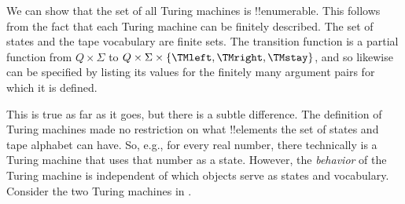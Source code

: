 \documentclass[../../../include/open-logic-section]{subfiles}
\begin{document}

\begin{explain}
We can show that the set of all Turing machines is !!{enumerable}.
This follows from the fact that each Turing machine can be finitely
described.  The set of states and the tape vocabulary are finite sets.
The transition function is a partial function from $Q \times \Sigma$
to $Q \times \Sigma \times \{\TMleft, \TMright, \TMstay\}$, and so
likewise can be specified by listing its values for the finitely many
argument pairs for which it is defined.

This is true as far as it goes, but there is a subtle difference. The
definition of Turing machines made no restriction on what !!{element}s
the set of states and tape alphabet can have. So, e.g., for every real
number, there technically is a Turing machine that uses that number as
a state. However, the \emph{behavior} of the Turing machine is
independent of which objects serve as states and vocabulary. Consider
the two Turing machines in .
\begin{figure}
\begin{center}
\\
\end{center}
\end{figure}
\end{explain}
\end{document}
